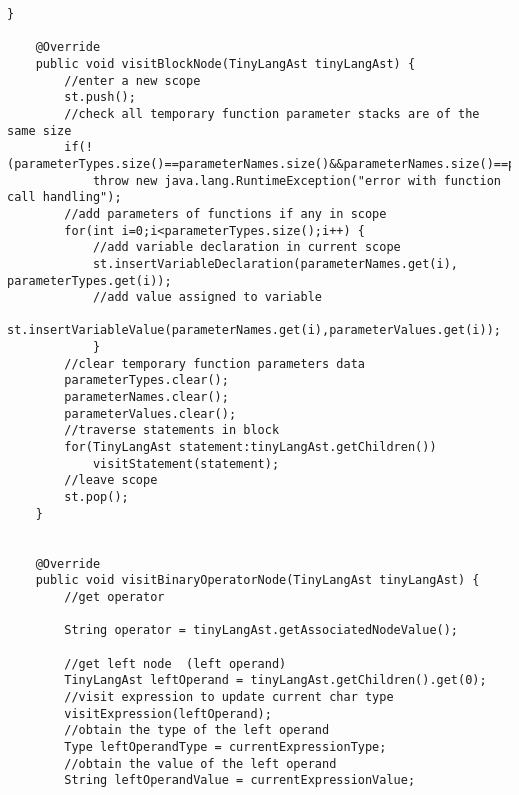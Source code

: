 \begin{lstlisting}[basicstyle=\miniscule,caption=Interpreter,label=listing:interpreter]
	}

	@Override
	public void visitBlockNode(TinyLangAst tinyLangAst) {
		//enter a new scope
		st.push();
		//check all temporary function parameter stacks are of the same size
		if(!(parameterTypes.size()==parameterNames.size()&&parameterNames.size()==parameterValues.size())) 
			throw new java.lang.RuntimeException("error with function call handling");
		//add parameters of functions if any in scope
		for(int i=0;i<parameterTypes.size();i++) {
			//add variable declaration in current scope 
			st.insertVariableDeclaration(parameterNames.get(i), parameterTypes.get(i));
			//add value assigned to variable 
			st.insertVariableValue(parameterNames.get(i),parameterValues.get(i));		
			}
		//clear temporary function parameters data
		parameterTypes.clear();
		parameterNames.clear();
		parameterValues.clear();
		//traverse statements in block
		for(TinyLangAst statement:tinyLangAst.getChildren())
			visitStatement(statement);
		//leave scope
		st.pop();		
	}

	
	@Override
	public void visitBinaryOperatorNode(TinyLangAst tinyLangAst) {
		//get operator 

		String operator = tinyLangAst.getAssociatedNodeValue();

		//get left node  (left operand)
		TinyLangAst leftOperand = tinyLangAst.getChildren().get(0);
		//visit expression to update current char type
		visitExpression(leftOperand);
		//obtain the type of the left operand
		Type leftOperandType = currentExpressionType;
		//obtain the value of the left operand
		String leftOperandValue = currentExpressionValue;
		

\end{lstlisting}
